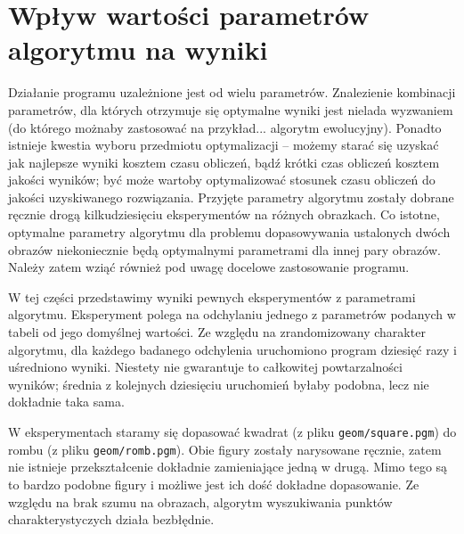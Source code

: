 \documentclass[a4paper,12pt,leqno]{article}
\begin{document}
\section{Wpływ wartości parametrów algorytmu na wyniki}

Działanie programu uzależnione jest od wielu parametrów. Znalezienie kombinacji parametrów, dla których otrzymuje się optymalne wyniki jest nielada
wyzwaniem (do którego możnaby zastosować na przykład... algorytm ewolucyjny). Ponadto istnieje kwestia wyboru przedmiotu optymalizacji -- możemy starać
się uzyskać jak najlepsze wyniki kosztem czasu obliczeń, bądź krótki czas obliczeń kosztem jakości wyników; być może wartoby optymalizować stosunek
czasu obliczeń do jakości uzyskiwanego rozwiązania. Przyjęte parametry algorytmu zostały dobrane ręcznie drogą kilkudziesięciu eksperymentów na
różnych obrazkach. Co istotne, optymalne parametry algorytmu dla problemu dopasowywania ustalonych dwóch obrazów niekoniecznie będą optymalnymi
parametrami dla innej pary obrazów. Należy zatem wziąć również pod uwagę docelowe zastosowanie programu. 

W tej części przedstawimy wyniki pewnych eksperymentów z parametrami algorytmu. Eksperyment polega na odchylaniu jednego z parametrów podanych w 
tabeli od jego domyślnej wartości. Ze względu na zrandomizowany charakter algorytmu, dla każdego badanego odchylenia uruchomiono program dziesięć
razy i uśredniono wyniki. Niestety nie gwarantuje to całkowitej powtarzalności wyników; średnia z kolejnych dziesięciu uruchomień byłaby podobna,
lecz nie dokładnie taka sama.

W eksperymentach staramy się dopasować kwadrat (z pliku \texttt{geom/square.pgm}) do rombu (z pliku \texttt{geom/romb.pgm}). Obie figury zostały
narysowane ręcznie, zatem nie istnieje przekształcenie dokładnie zamieniające jedną w drugą. Mimo tego są to bardzo podobne figury i możliwe jest
ich dość dokładne dopasowanie. Ze względu na brak szumu na obrazach, algorytm wyszukiwania punktów charakterystyczych działa bezbłędnie.
\end{document}
